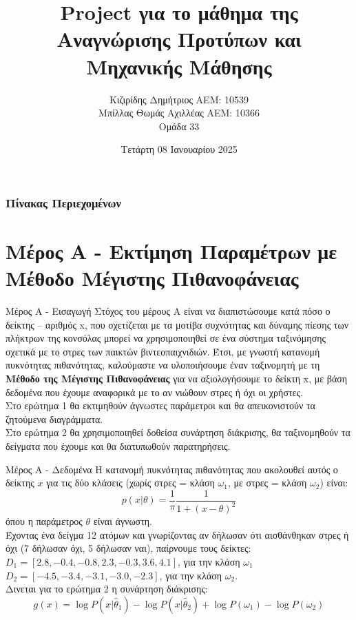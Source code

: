 \documentclass{beamer}
\title[PR - ML Project]{Project για το μάθημα της Αναγνώρισης Προτύπων και Μηχανικής Μάθησης}
\author[Κιζιρίδης Δ. Μπίλλας Θ.Α.]{Κιζιρίδης Δημήτριος ΑΕΜ: 10539 \\ Μπίλλας Θωμάς Αχιλλέας ΑΕΜ: 10366\\ Ομάδα 33}
\date{Τετάρτη 08 Ιανουαρίου 2025}
\institute[]{Τμήμα Ηλεκτρολόγων Μηχανικών και Μηχανικών Υπολογιστών ΑΠΘ}
\begin{document}
\frame{\titlepage}


\begin{frame}
    \frametitle{Πίνακας Περιεχομένων}
    \small
    \tableofcontents
\end{frame}


\section{Μέρος Α - Εκτίμηση Παραμέτρων με Μέθοδο Μέγιστης Πιθανοφάνειας}
\begin{frame}{Μέρος Α - Εισαγωγή}
    Στόχος του μέρους Α είναι να διαπιστώσουμε κατά πόσο ο δείκτης – αριθμός x, που σχετίζεται με τα μοτίβα συχνότητας και δύναμης πίεσης των πλήκτρων της κονσόλας μπορεί να χρησιμοποιηθεί σε ένα σύστημα ταξινόμησης σχετικά με το στρες των παικτών βιντεοπαιχνιδιών.
    Έτσι, με γνωστή κατανομή πυκνότητας πιθανότητας, καλούμαστε να υλοποιήσουμε έναν ταξινομητή με τη \textbf{Μέθοδο της Μέγιστης Πιθανοφάνειας} για να αξιολογήσουμε το δείκτη x, με βάση δεδομένα που έχουμε αναφορικά με το αν νιώθουν στρες ή όχι οι χρήστες.\\
Στο ερώτημα 1 θα εκτιμηθούν άγνωστες παράμετροι και θα απεικονιστούν τα ζητούμενα διαγράμματα.\\
Στο ερώτημα 2 θα χρησιμοποιηθεί δοθείσα συνάρτηση διάκρισης, θα ταξινομηθούν τα δείγματα που έχουμε και θα διατυπωθούν παρατηρήσεις.

\end{frame}
\begin{frame}{Μέρος Α - Δεδομένα}
Η κατανομή πυκνότητας πιθανότητας που ακολουθεί αυτός ο δείκτης $x$ για τις δύο κλάσεις (χωρίς στρες = κλάση $ω_1$, με στρες = κλάση $ω_2$) είναι:
$$p(x|\theta) = \frac{1}{\pi} \frac{1}{1+(x-\theta)^2}$$ όπου η παράμετρος $\theta$ είναι άγνωστη.\\ 
Έχοντας ένα δείγμα 12 ατόμων και γνωρίζοντας αν δήλωσαν ότι αισθάνθηκαν στρες ή όχι (7 δήλωσαν όχι, 5 δήλωσαν ναι), παίρνουμε τους δείκτες:\\
 $D_1=[ 2.8, -0.4, -0.8, 2.3, -0.3, 3.6, 4.1]$, για την κλάση $ω_1$
 $D_2=[-4.5, -3.4, -3.1, -3.0, -2.3]$, για την κλάση $ω_2$.\\
Δινεται για το ερώτημα 2 η συνάρτηση διάκρισης:
$$g(x) = \log P(x | \hat{\theta}_1) - \log P(x | \hat{\theta}_2) + \log P(\omega_1) - \log P(\omega_2)$$
\end{frame}
\end{document}
